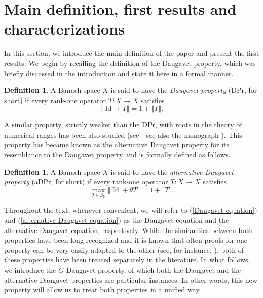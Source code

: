 \documentclass[a4paper,12pt]{amsart}
\theoremstyle{definition}
\theoremstyle{definition}
\newtheorem{definition}[theorem]{Definition}
\theoremstyle{remark}
\numberwithin{equation}{section}
\newcommand{\K}{\mathbb{K}}
\DeclareMathOperator{\id}{Id}
\newcommand{\<}{\langle}
\renewcommand{\>}{\rangle}
\newcommand{\norm}[1]{\left\Vert#1\right\Vert}
\begin{document}
	
	
	
	\section{Main definition, first results and characterizations} \label{sec: definition}
	
	In this section, we introduce the main definition of the paper and present the first results. We begin by recalling the definition of the Daugavet property, which was briefly discussed in the introduction and state it here in a formal manner.
	\begin{definition}
		A Banach space $X$ is said to have the {\it Daugavet property} (DPr, for short) if every rank-one operator $T:X\to X$ satisfies
		\begin{equation} \label{Daugavet-equation}
			\norm{\id+T}=1+\norm{T}.
		\end{equation}
	\end{definition}
	A similar property, strictly weaker than the DPr, with roots in the theory of numerical ranges has been also studied (see \cite{MO2004} - see also the monograph \cite{KadetsMartinMeriPerez2018}). This property has became known as the alternative Daugavet property for its resemblance to the Daugavet property and is formally defined as follows.
	\begin{definition} A Banach space $X$ is said to have the {\it alternative Daugavet property} (aDPr, for short) if every rank-one operator $T:X\to X$ satisfies 
		\begin{equation} \label{alternative-Daugavet-equation}
			\max_{\theta \in S_{\K}}\norm{\id+\theta T}=1+\norm{T}.
		\end{equation}
		
	\end{definition}
	
	
	Throughout the text, whenever convenient, we will refer to (\ref{Daugavet-equation}) and (\ref{alternative-Daugavet-equation}) as the Daugavet equation and the alternative Daugavet equation, respectively. While the similarities between both properties have been long recognized and it is known that often proofs for one property can be very easily adapted to the other (see, for instance, \cite[Section 12.3]{Kadets2000}), both of these properties have been treated separately in the literature. In what follows, we introduce the $G$-Daugavet property, of which both the Daugavet and the alternative Daugavet properties are particular instances. In other words, this new property will allow us to treat both properties in a unified way.
	
\end{document}
